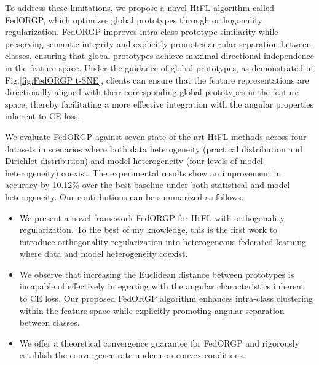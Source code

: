 To address these limitations, we propose a novel HtFL algorithm called FedORGP, which optimizes global prototypes through orthogonality regularization. FedORGP improves intra-class prototype similarity while preserving semantic integrity and explicitly promotes angular separation between classes, ensuring that global prototypes achieve maximal directional independence in the feature space. Under the guidance of global prototypes, as demonstrated in Fig.\ref{fig:FedORGP t-SNE}, clients can ensure that the feature representations are directionally aligned with their corresponding global prototypes in the feature space, thereby facilitating a more effective integration with the angular properties inherent to CE loss.

We evaluate FedORGP against seven state-of-the-art HtFL methods across four datasets in scenarios where both data heterogeneity (practical distribution and Dirichlet distribution) and model heterogeneity (four levels of model heterogeneity) coexist. The experimental results show an improvement in accuracy by 10.12\% over the best baseline under both statistical and model heterogeneity. Our contributions can be summarized as follows:

\begin{itemize}
    \item We present a novel framework FedORGP for HtFL with orthogonality regularization. To the best of my knowledge, this is the first work to introduce orthogonality regularization into heterogeneous federated learning where data and model heterogeneity coexist.
    \item We observe that increasing the Euclidean distance between prototypes is incapable of effectively integrating with the angular characteristics inherent to CE loss. Our proposed FedORGP algorithm enhances intra-class clustering within the feature space while explicitly promoting angular separation between classes.
    \item We offer a theoretical convergence guarantee for FedORGP and rigorously establish the convergence rate under non-convex conditions.
\end{itemize}